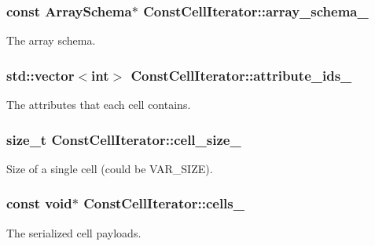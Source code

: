 \subsubsection[{array\+\_\+schema\+\_\+}]{\setlength{\rightskip}{0pt plus 5cm}const {\bf Array\+Schema}$\ast$ Const\+Cell\+Iterator\+::array\+\_\+schema\+\_\+\hspace{0.3cm}{\ttfamily [private]}}\label{classConstCellIterator_a091a6b1b3a36f324ffdf137dd921da5e}
The array schema. \hypertarget{classConstCellIterator_a1fe5f139b56c0d9f54c154518b125cb5}{}
\subsubsection[{attribute\+\_\+ids\+\_\+}]{\setlength{\rightskip}{0pt plus 5cm}std\+::vector$<$int$>$ Const\+Cell\+Iterator\+::attribute\+\_\+ids\+\_\+\hspace{0.3cm}{\ttfamily [private]}}\label{classConstCellIterator_a1fe5f139b56c0d9f54c154518b125cb5}
The attributes that each cell contains. \hypertarget{classConstCellIterator_a36497b3f8c5d56eba0baccc5e73957b4}{}
\subsubsection[{cell\+\_\+size\+\_\+}]{\setlength{\rightskip}{0pt plus 5cm}size\+\_\+t Const\+Cell\+Iterator\+::cell\+\_\+size\+\_\+\hspace{0.3cm}{\ttfamily [private]}}\label{classConstCellIterator_a36497b3f8c5d56eba0baccc5e73957b4}
Size of a single cell (could be V\+A\+R\+\_\+\+S\+I\+Z\+E). \hypertarget{classConstCellIterator_a3e068d10abd01c3379ec072e9a05247b}{}
\subsubsection[{cells\+\_\+}]{\setlength{\rightskip}{0pt plus 5cm}const void$\ast$ Const\+Cell\+Iterator\+::cells\+\_\+\hspace{0.3cm}{\ttfamily [private]}}\label{classConstCellIterator_a3e068d10abd01c3379ec072e9a05247b}
The serialized cell payloads. \hypertarget{classConstCellIterator_a0690017c4778d17a5b61ae0215867dfb}{}
